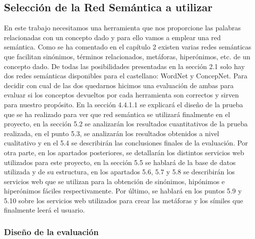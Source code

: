 \subsection{Selección de la Red Semántica a utilizar}
\label{cap:subsec:redsemanticautilizada}

En este trabajo necesitamos una herramienta que nos proporcione las palabras relacionadas con un concepto dado y para ello vamos a emplear una red semántica.
Como se ha comentado en el capítulo 2 existen varias redes semánticas que facilitan sinónimos, términos relacionados, metáforas, hiperónimos, etc. de un concepto dado. 
De todas las posibilidades presentadas en la sección 2.1 solo hay dos redes semánticas disponibles para el castellano: WordNet y ConcepNet. Para decidir con cual de las dos quedarnos hicimos una evaluación de ambas para evaluar si los conceptos devueltos por cada herramienta son correctos y sirven para nuestro propósito. En la sección 4.4.1.1 se explicará el diseño de la prueba que se ha realizado para ver que red semántica se utilizará finalmente en el proyecto, en la sección 5.2 se analizarán los resultados cuantitativos de la prueba realizada, en el punto 5.3, se analizarán los resultados obtenidos a nivel cualitativo y en el 5.4 se describirán las conclusiones finales de la evaluación. Por otra parte, en los apartados posteriores, se detallarán los distintos servicios web utilizados para este proyecto, en la sección 5.5 se hablará de la base de datos utilizada y de su estructura, en los apartados 5.6, 5.7 y 5.8 se describirán los servicios web que se utilizan para la obtención de sinónimos, hipónimos e hiperónimos fáciles respectivamente. Por último, se hablará en los puntos 5.9 y 5.10 sobre los servicios web utilizados para crear las metáforas y los símiles que finalmente leerá el usuario.


\subsubsection{Diseño de la evaluación}
\label{cap:subsec:disenioeval}


